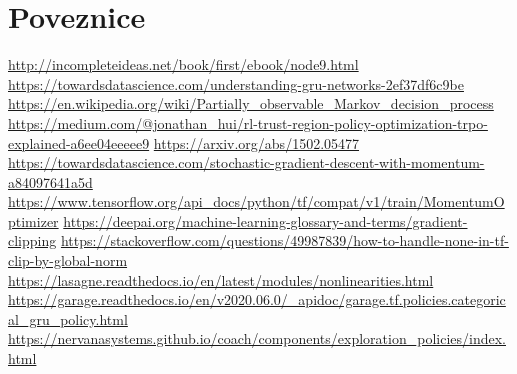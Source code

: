 \section{Poveznice}
\url{http://incompleteideas.net/book/first/ebook/node9.html}
\url{https://towardsdatascience.com/understanding-gru-networks-2ef37df6c9be}
\url{https://en.wikipedia.org/wiki/Partially_observable_Markov_decision_process}
\url{https://medium.com/@jonathan_hui/rl-trust-region-policy-optimization-trpo-explained-a6ee04eeeee9}
\url{https://arxiv.org/abs/1502.05477}
\url{https://towardsdatascience.com/stochastic-gradient-descent-with-momentum-a84097641a5d}
\url{https://www.tensorflow.org/api_docs/python/tf/compat/v1/train/MomentumOptimizer}
\url{https://deepai.org/machine-learning-glossary-and-terms/gradient-clipping}
\url{https://stackoverflow.com/questions/49987839/how-to-handle-none-in-tf-clip-by-global-norm}
\url{https://lasagne.readthedocs.io/en/latest/modules/nonlinearities.html}
\url{https://garage.readthedocs.io/en/v2020.06.0/_apidoc/garage.tf.policies.categorical_gru_policy.html}
\url{https://nervanasystems.github.io/coach/components/exploration_policies/index.html}

